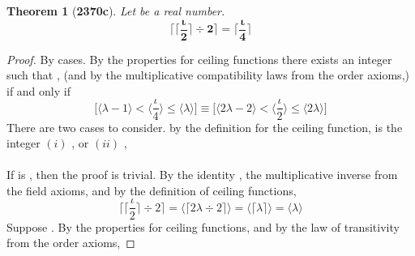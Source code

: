 \documentclass[preview]{standalone}
\newtheorem*{theorem*}{Theorem}
\begin{document}
\begin{theorem*}[\textbf{2370c}]
    Let \bm{$\iota$} be a real number.
    \begin{equation*}
        \bm{
            \Bigg \lceil \bigg \lceil \frac{\iota}{2} \bigg \rceil \div 2 \Bigg \rceil 
                = 
            \Bigg \lceil \frac{\iota}{4} \Bigg \rceil
        }
    \end{equation*}
\end{theorem*}

\begin{proof}
    By cases.
    By the properties for ceiling functions there exists an integer \bm{$\lambda$} such that
    , 
    (and by the multiplicative compatibility laws from the order axioms,)
    if and only if
    \begin{equation*}
        \bigg[
            \Big \langle \lambda - 1 \Big \rangle
                < 
            \Big \langle \frac{\iota}{4} \Big \rangle 
                \le 
            \Big \langle \lambda \Big \rangle
        \bigg]
            \equiv
        \bigg[
            \Big \langle 2 \lambda - 2 \Big \rangle
                < 
            \Big \langle \frac{\iota}{2} \Big \rangle 
                \le 
            \Big \langle 2 \lambda \Big \rangle
        \bigg]
    \end{equation*}
    There are two cases to consider. 
    by the definition for the ceiling function, 
     is the integer
    $(i)$ \bm{$2 \lambda$}, or $(ii)$ ,
    \\ \\
     If  is \bm{$2 \lambda$},
    then the proof is trivial. By the identity \bm{$\lambda$}, 
    the multiplicative inverse from the field axioms, 
    and by the definition of ceiling functions, 
    \begin{equation*}
        \bigg \lceil \Big \lceil \frac{\iota}{2} \Big \rceil \div 2 \bigg \rceil
            =
        \bigg \langle \big \lceil 2 \lambda \div 2 \big \rceil \bigg \rangle
            =
        \bigg \langle \big \lceil \lambda \big \rceil \bigg \rangle
            =
        \bigg \langle \lambda \bigg \rangle
    \end{equation*}
     Suppose .
    By the properties for ceiling functions,
    and by the law of transitivity from the order axioms,

\end{proof}
\end{document}
